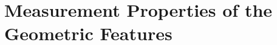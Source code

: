 \providecommand{\clarify}[1]{\textcolor{red}{\textbf{Clarification needed:} #1}}
\section{Measurement Properties of the Geometric Features}
\label{sec:method-validity}

